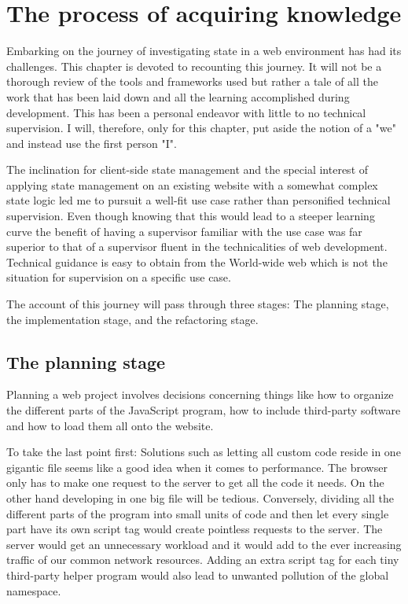 \documentclass[english]{ifimaster}
\begin{document}
\chapter{The process of acquiring knowledge}
Embarking on the journey of investigating state in a web environment has had its challenges. This chapter is devoted to recounting this journey. It will not be a thorough review of the tools and frameworks used but rather a tale of all the work that has been laid down and all the learning accomplished during development. This has been a personal endeavor with little to no technical supervision. I will, therefore, only for this chapter, put aside the notion of a "we" and instead use the first person "I". 

The inclination for client-side state management and the special interest of applying state management on an existing website with a somewhat complex state logic led me to pursuit a well-fit use case rather than personified technical supervision. Even though knowing that this would lead to a steeper learning curve the benefit of having a supervisor familiar with the use case was far superior to that of a supervisor fluent in the technicalities of web development. Technical guidance is easy to obtain from the World-wide web which is not the situation for supervision on a specific use case.  

The account of this journey will pass through three stages: The planning stage, the implementation stage, and the refactoring stage. 

\section{The planning stage}
Planning a web project involves decisions concerning things like how to organize the different parts of the JavaScript program, how to include third-party software and how to load them all onto the website. 

To take the last point first: Solutions such as letting all custom code reside in one gigantic file seems like a good idea when it comes to performance. The browser only has to make one request to the server to get all the code it needs. On the other hand developing in one big file will be tedious. Conversely, dividing all the different parts of the program into small units of code and then let every single part have its own script tag would create pointless requests to the server. The server would get an unnecessary workload and it would add to the ever increasing traffic of our common network resources. Adding an extra script tag for each tiny third-party helper program would also lead to unwanted pollution of the global namespace.
\end{document}
